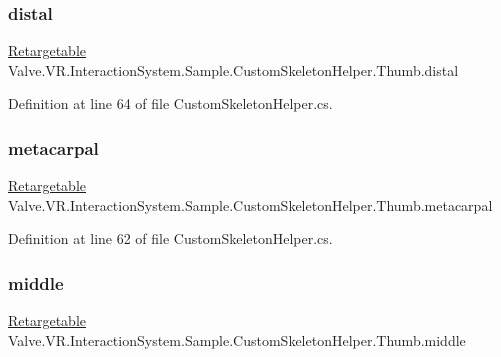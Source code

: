 \subsubsection{\texorpdfstring{distal}{distal}}
{\footnotesize\ttfamily \mbox{\hyperlink{class_valve_1_1_v_r_1_1_interaction_system_1_1_sample_1_1_custom_skeleton_helper_1_1_retargetable}{Retargetable}} Valve.\+V\+R.\+Interaction\+System.\+Sample.\+Custom\+Skeleton\+Helper.\+Thumb.\+distal}



Definition at line 64 of file Custom\+Skeleton\+Helper.\+cs.

\mbox{\label{class_valve_1_1_v_r_1_1_interaction_system_1_1_sample_1_1_custom_skeleton_helper_1_1_thumb_ad15d797cab49703ff5591a6f773b2de0}} 
\subsubsection{\texorpdfstring{metacarpal}{metacarpal}}
{\footnotesize\ttfamily \mbox{\hyperlink{class_valve_1_1_v_r_1_1_interaction_system_1_1_sample_1_1_custom_skeleton_helper_1_1_retargetable}{Retargetable}} Valve.\+V\+R.\+Interaction\+System.\+Sample.\+Custom\+Skeleton\+Helper.\+Thumb.\+metacarpal}



Definition at line 62 of file Custom\+Skeleton\+Helper.\+cs.

\mbox{\label{class_valve_1_1_v_r_1_1_interaction_system_1_1_sample_1_1_custom_skeleton_helper_1_1_thumb_a35306b823b83e537832d0205016d3d43}} 
\subsubsection{\texorpdfstring{middle}{middle}}
{\footnotesize\ttfamily \mbox{\hyperlink{class_valve_1_1_v_r_1_1_interaction_system_1_1_sample_1_1_custom_skeleton_helper_1_1_retargetable}{Retargetable}} Valve.\+V\+R.\+Interaction\+System.\+Sample.\+Custom\+Skeleton\+Helper.\+Thumb.\+middle}



